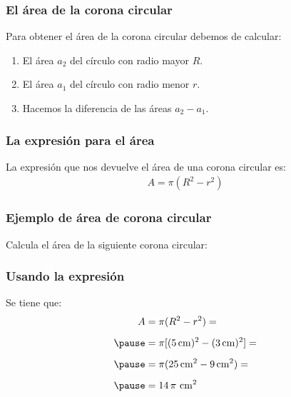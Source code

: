 \documentclass[14pt]{beamer}
\begin{document}
\begin{frame}
\frametitle{El área de la corona circular}
Para obtener el área de la corona circular debemos de calcular:
\begin{enumerate}[<+->]
\item El área $a_{2}$ del círculo con radio mayor $R$.
\item El área $a_{1}$ del círculo con radio menor $r$.
\item Hacemos la diferencia de las áreas $a_{2} - a_{1}$.
\end{enumerate}
\end{frame}
\begin{frame}
\frametitle{La expresión para el área}
La expresión que nos devuelve el área de una corona circular es:
\pause
\begin{align*}
A = \pi (R^{2} - r^{2})
\end{align*}
\end{frame}
\begin{frame}
\frametitle{Ejemplo de área de corona circular}
Calcula el área de la siguiente corona circular:
\pause
\begin{figure}
    \centering
\end{figure}
\end{frame}
\begin{frame}
\frametitle{Usando la expresión}
Se tiene que:
\begin{eqnarray*}
\begin{aligned}
A &= \pi (R^{2} - r^{2}) = \\[0.5em] \pause
&= \pi [ (\SI{5}{\centi\meter})^{2} - (\SI{3}{\centi\meter})^{2}] = \\[0.5em] \pause
&= \pi ( \SI{25}{\square\centi\meter} - \SI{9}{\square\centi\meter}) = \\[0.5em] \pause
&= 14 \, \pi \,\, \unit{\square\centi\meter}
\end{aligned}
\end{eqnarray*}
\end{frame}
\end{document}
